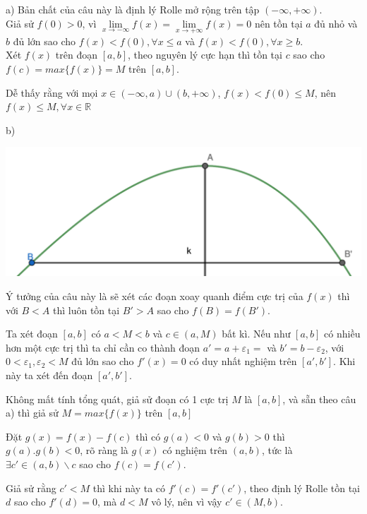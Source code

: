 \documentclass[11pt]{scrartcl}
\begin{document}
\begin{itemize}[label=, leftmargin=0em, itemsep=0.5em]
    \begin{sol}
        a) Bản chất của câu này là định lý Rolle mở rộng trên tập $(-\infty,+\infty)$. \\
        Giả sử $f(0) > 0$, vì $\underset{x\to -\infty }{\mathop{\lim }}f(x)=\underset{x\to +\infty }{\mathop{\lim }}f(x)=0$ nên tồn tại $a$ đủ nhỏ và $b$ đủ lớn sao cho $f(x) < f(0), \forall x \leq a$ và $f(x) < f(0), \forall x \geq b$.\\ Xét $f(x)$ trên đoạn $[a,b]$, theo nguyên lý cực hạn thì tồn tại $c$ sao cho $f(c) = max\{f(x)\} = M$ trên $[a,b]$. 
        
        
        Dễ thấy rằng với mọi $x \in (-\infty, a) \cup (b, +\infty)$, $f(x) < f(0) \leq M$, nên $f(x) \leq M, \forall x \in \mathbb{R}$


        b)
        \begin{center}
            \includegraphics[scale=0.4]{2019.pdf}
        \end{center}
        Ý tưởng của câu này là sẽ xét các đoạn xoay quanh điểm cực trị của $f(x)$ thì với $B < A$ thì luôn tồn tại $B' > A$ sao cho $f(B)  = f(B')$.
        
        
        Ta xét đoạn $[a,b]$ có $a < M < b$ và $c \in (a,M)$ bất kì. Nếu như $[a,b]$ có nhiều hơn một cực trị thì ta chỉ cần co thành đoạn $a' = a + \varepsilon_1 = $ và $b' = b - \varepsilon_2$, với $0 < \varepsilon_1, \varepsilon_2 < M$ đủ lớn sao cho $f'(x) = 0$ có duy nhất nghiệm trên $[a',b']$. Khi này ta xét đến đoạn $[a',b']$. 
        
        
        Không mất tính tổng quát, giả sử đoạn có 1 cực trị $M$ là $[a,b]$, và sẵn theo câu a) thì giả sử $M = max\{f(x)\}$ trên $[a,b]$
        
        
        Đặt $g(x) = f(x) - f(c)$ thì có $g(a) < 0$ và $ g(b) > 0$ thì $g(a).g(b) < 0$, rõ ràng là $g(x)$ có nghiệm trên $(a,b)$, tức là $\exists c' \in (a,b)\backslash{c}$ sao cho $f(c) = f(c')$. 


        Giả sử rằng $c' < M$ thì khi này ta có $f'(c) = f'(c')$, theo định lý Rolle tồn tại $d$ sao cho $f'(d) = 0$, mà $d < M$ vô lý, nên vì vậy $c' \in (M,b)$. 
        

\end{sol}
\end{itemize}
\end{document}
